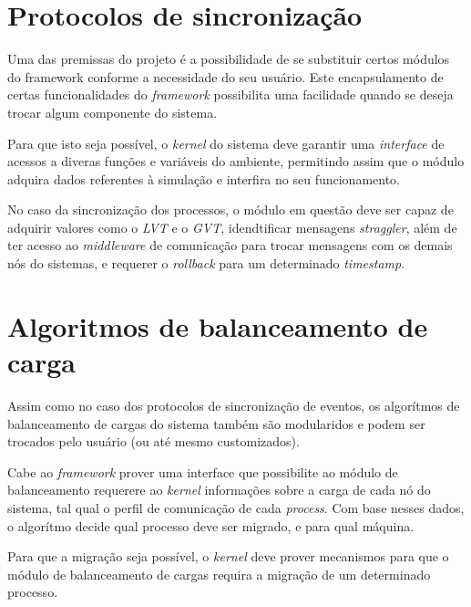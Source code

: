 \section{Protocolos de sincronização}

Uma das premissas do projeto é a possibilidade de se substituir certos módulos do framework conforme a necessidade do seu usuário. Este encapsulamento de certas funcionalidades do \textit{framework} possibilita uma facilidade quando se deseja trocar algum componente do sistema.

Para que isto seja possível, o \textit{kernel} do sistema deve garantir uma \textit{interface} de acessos a diveras funções e variáveis do ambiente, permitindo assim que o módulo adquira dados referentes à simulação e interfira no seu funcionamento.

No caso da sincronização dos processos, o módulo em questão deve ser capaz de adquirir valores como o \textit{LVT} e o \textit{GVT}, idendtificar mensagens \textit{straggler}, além de ter acesso ao \textit{middleware} de comunicação para trocar mensagens com os demais nós do sistemas, e requerer o \textit{rollback} para um determinado \textit{timestamp}.

\section{Algoritmos de balanceamento de carga}

Assim como no caso dos protocolos de sincronização de eventos, os algorítmos de balanceamento de cargas do sistema também são modularidos e podem ser trocados pelo usuário (ou até mesmo customizados).

Cabe ao \textit{framework} prover uma interface que possibilite ao módulo de balanceamento requerere ao \textit{kernel} informações sobre a carga de cada nó do sistema, tal qual o perfil de comunicação de cada \textit{process}. Com base nesses dados, o algorítmo decide qual processo deve ser migrado, e para qual máquina.

Para que a migração seja possível, o \textit{kernel} deve prover mecanismos para que o módulo de balanceamento de cargas requira a migração de um determinado processo.

